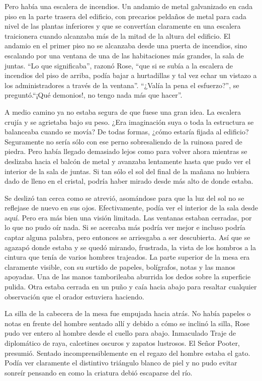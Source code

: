 {Pero había una escalera de incendios. Un andamio de metal galvanizado
	en cada piso en la parte trasera del edificio, con precarios peldaños de
	metal para cada nivel de las plantas inferiores y que se convertían
	claramente en una escalera traicionera cuando alcanzaba más de la mitad
	de la altura del edificio. El andamio en el primer piso no se alcanzaba
	desde una puerta de incendios, sino escalando por una ventana de una de
	las habitaciones más grandes, la sala de juntas. ``Lo que significaba'',
	razonó Rose, ``que si se subía a la escalera de incendios del piso de
	arriba, podía bajar a hurtadillas y tal vez echar un vistazo a los
	administradores a través de la ventana''. ``¿Valía la pena el
	esfuerzo?'', se preguntó.``¡Qué demonios!, no tengo nada más que
hacer''.}

{A medio camino ya no estaba segura de que fuese una gran idea. La
	escalera crujía y se agrietaba bajo su peso. ¿Era imaginación suya o
	toda la estructura se balanceaba cuando se movía? De todas formas,
	¿cómo estaría fijada al edificio? Seguramente no sería sólo con ese
	perno sobresaliendo de la ruinosa pared de piedra. Pero había llegado
	demasiado lejos como para volver ahora mientras se deslizaba hacia el
	balcón de metal y avanzaba lentamente hasta que pudo ver el interior de
	la sala de juntas. Si tan sólo el sol del final de la mañana no hubiera
	dado de lleno en el cristal, podría haber mirado desde más alto de donde
estaba.}

{Se deslizó tan cerca como se atrevió, asomándose para que la luz del
	sol no se reflejase de nuevo en sus ojos. Efectivamente, podía ver el
	interior de la sala desde aquí. Pero era más bien una visión limitada.
	Las ventanas estaban cerradas, por lo que no pudo oír nada. Si se
	acercaba más podría ver mejor e incluso podría captar alguna palabra,
	pero entonces se arriesgaba a ser descubierta. Así que se agazapó donde
	estaba y se quedó mirando, frustrada, la vista de los hombros a la
	cintura que tenía de varios hombres trajeados. La parte superior de la
	mesa era claramente visible, con su surtido de papeles, bolígrafos,
	notas y las manos apoyadas. Una de las manos tamborileaba aburrida los
	dedos sobre la superficie pulida. Otra estaba cerrada en un puño y caía
	hacia abajo para resaltar cualquier observación que el orador estuviera
haciendo.}

{La silla de la cabecera de la mesa fue empujada hacia atrás. No había
	papeles o notas en frente del hombre sentado allí y debido a cómo se
	inclinó la silla, Rose pudo ver entero al hombre desde el cuello para
	abajo. Inmaculado Traje de diplomático de raya, calcetines oscuros y
	zapatos lustrosos. El Señor Pooter, presumió. Sentado
	incomprensiblemente en el regazo del hombre estaba el gato. Podía ver
	claramente el distintivo triángulo blanco de piel y no pudo evitar
sonreír pensando en como la criatura debió escaparse del río.}

